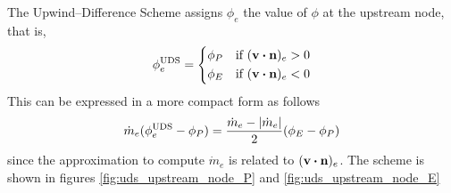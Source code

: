 The Upwind--Difference Scheme assigns $\phi_e$ the value of $\phi$ at the upstream node, that is,
\begin{equation}
	\phi_e^\text{UDS} = 
	\left\{
	\begin{aligned}
		&\phi_P & &\text{if } (\vb{v} \vdot \vb{n})_e > 0 \\
		&\phi_E & &\text{if } (\vb{v} \vdot \vb{n})_e < 0 \\
	\end{aligned}
	\right.
\end{equation}
This can be expressed in a more compact form as follows
\begin{equation}
	\dot{m}_e ( \phi_e^\text{UDS} - \phi_P ) = 
	\frac{\dot{m}_e - \abs{\dot{m}_e}}{2} ( \phi_E - \phi_P )
\end{equation}
since the approximation to compute $\dot{m}_e$ is related to $(\vb{v} \vdot \vb{n})_e$. The scheme is shown in figures \ref{fig:uds_upstream_node_P} and \ref{fig:uds_upstream_node_E}

